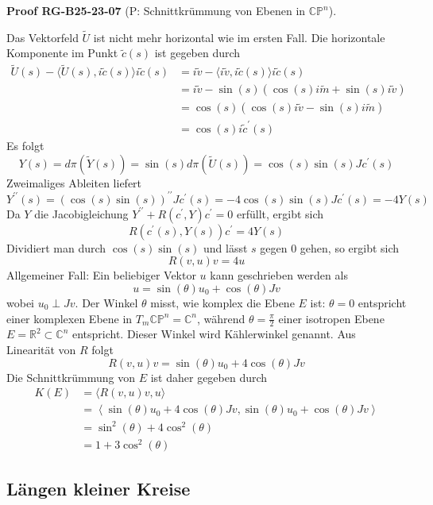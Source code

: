 \documentclass[10pt, letterpaper]{article}
\newcommand{\CustomHeading}[3]{%
  \par\medskip\noindent%
  \textbf{#1 #2} \textnormal{(#3)}.\enskip%
}
\newenvironment{PROOF}[2]{\begin{unitbox}\CustomHeading{Proof}{#1}{#2}}{\end{unitbox}}
\begin{document}
\begin{PROOF}{RG-B25-23-07}{P: Schnittkrümmung von Ebenen in $\mathbb{C P}^{n}$}
Das Vektorfeld $\tilde{U}$ ist nicht mehr horizontal wie im ersten Fall. Die horizontale Komponente im Punkt $\tilde{c}(s)$ ist gegeben durch
$$
\begin{aligned}
\tilde{U}(s)-\langle\tilde{U}(s), i \tilde{c}(s)\rangle i \tilde{c}(s) & =i \tilde{v}-\langle i \tilde{v}, i \tilde{c}(s)\rangle i \tilde{c}(s) \\
& =i \tilde{v}-\sin (s)(\cos (s) i \tilde{m}+\sin (s) i \tilde{v}) \\
& =\cos (s)(\cos (s) i \tilde{v}-\sin (s) i \tilde{m}) \\
& =\cos (s) i \tilde{c}^{\prime}(s)
\end{aligned}
$$
Es folgt
\begin{equation*}
Y(s)=d \pi(\tilde{Y}(s))=\sin (s) d \pi(\tilde{U}(s))=\cos (s) \sin (s) J c^{\prime}(s)
\end{equation*}
Zweimaliges Ableiten liefert
$$
Y^{\prime \prime}(s)=(\cos (s) \sin (s))^{\prime \prime} J c^{\prime}(s)=-4 \cos (s) \sin (s) J c^{\prime}(s)=-4 Y(s)
$$
Da $Y$ die Jacobigleichung $Y^{\prime \prime}+R\left(c^{\prime}, Y\right) c^{\prime}=0$ erfüllt, ergibt sich
$$
R\left(c^{\prime}(s), Y(s)\right) c^{\prime}=4 Y(s)
$$
Dividiert man durch $\cos (s) \sin (s)$ und lässt $s$ gegen 0 gehen, so ergibt sich
$$
R(v, u) v=4 u
$$
Allgemeiner Fall: Ein beliebiger Vektor $u$ kann geschrieben werden als
$$
u=\sin (\theta) u_{0}+\cos (\theta) J v
$$
wobei $u_{0} \perp J v$. Der Winkel $\theta$ misst, wie komplex die Ebene $E$ ist: $\theta=0$ entspricht einer komplexen Ebene in $T_{m} \mathbb{C P}^{n}=\mathbb{C}^{n}$, während $\theta=\frac{\pi}{2}$ einer isotropen Ebene $E=\mathbb{R}^{2} \subset \mathbb{C}^{n}$ entspricht. Dieser Winkel wird Kählerwinkel genannt. Aus Linearität von $R$ folgt
$$
R(v, u) v=\sin (\theta) u_{0}+4 \cos (\theta) J v
$$
Die Schnittkrümmung von $E$ ist daher gegeben durch
$$
\begin{aligned}
K(E) & =\langle R(v, u) v, u\rangle \\
& =\left\langle\sin (\theta) u_{0}+4 \cos (\theta) J v, \sin (\theta) u_{0}+\cos (\theta) J v\right\rangle \\
& =\sin ^{2}(\theta)+4 \cos ^{2}(\theta) \\
& =1+3 \cos ^{2}(\theta)
\end{aligned}
$$
\end{PROOF}




\pagebreak


\subsection{Längen kleiner Kreise}
\end{document}
